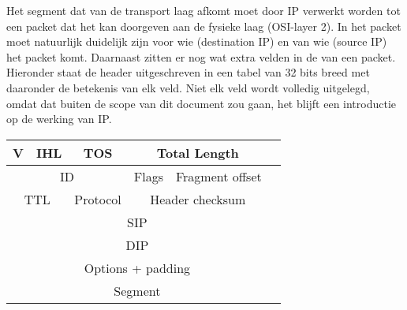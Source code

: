 Het segment dat van de transport laag afkomt moet door IP verwerkt worden tot een packet dat het kan doorgeven aan de fysieke laag (OSI-layer 2). In het packet moet natuurlijk duidelijk zijn voor wie (destination IP) en van wie (source IP) het packet komt. Daarnaast zitten er nog wat extra velden in de  van een packet. Hieronder staat de header uitgeschreven in een tabel van 32 bits breed met daaronder de betekenis van elk veld. Niet elk veld wordt volledig uitgelegd, omdat dat buiten de scope van dit document zou gaan, het blijft een introductie op de werking van IP.

\begin{tabular}{ |c|c|c|c|c|c| }
\hline
	V & IHL & TOS & \multicolumn{2}{c|}{Total Length} \\
\hline
	\multicolumn{3}{|c|}{ID} & Flags & Fragment offset \\
\hline
	\multicolumn{2}{|c|}{TTL} & Protocol & \multicolumn{2}{c|}{Header checksum} \\
\hline
	\multicolumn{5}{|c|}{SIP} \\
\hline
	\multicolumn{5}{|c|}{DIP} \\
\hline
	\multicolumn{5}{|c|}{Options + padding} \\
\hline
	\multicolumn{5}{|c|}{Segment} \\
\hline
\end{tabular}

